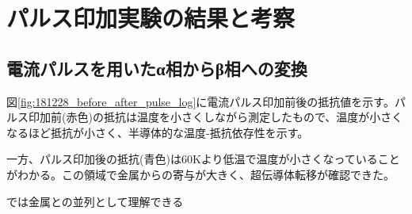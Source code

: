 \section{パルス印加実験の結果と考察}

\subsection{電流パルスを用いたα相からβ相への変換}
図\ref{fig:181228_before_after_pulse_log}に電流パルス印加前後の抵抗値を示す。パルス印加前(赤色)の抵抗は温度を小さくしながら測定したもので、温度が小さくなるほど抵抗が小さく、半導体的な温度-抵抗依存性を示す。

一方、パルス印加後の抵抗(青色)は60Kより低温で温度が小さくなっていることがわかる。この領域で金属からの寄与が大きく、超伝導体転移が確認できた。

では金属との並列として理解できる\cite{Mayr,McLachlan}

